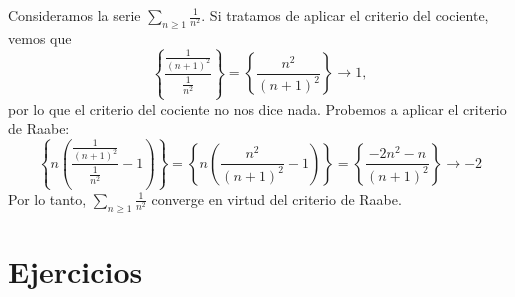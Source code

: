 \begin{ejemplo}
    Consideramos la serie $\displaystyle\sum_{n \geq 1} \frac{1}{n^2}$.
    Si tratamos de aplicar el criterio del cociente, vemos que
    \begin{equation*}
        \left\{ \frac{\frac{1}{(n+1)^2}}{\frac{1}{n^2}} \right\} = \left\{ \frac{n^2}{(n+1)^2} \right\} \longrightarrow 1,
    \end{equation*}
    por lo que el criterio del cociente no nos dice nada. Probemos a aplicar el criterio de Raabe:
    \begin{equation*}
        \left\{ n \left(\frac{\frac{1}{(n+1)^2}}{\frac{1}{n^2}} -1\right) \right\} = \left\{ n\left(\frac{n^2}{(n+1)^2}-1\right) \right\} = \left\{ \frac{-2n^2-n}{(n+1)^2} \right\} \longrightarrow -2
    \end{equation*}
    Por lo tanto, $\displaystyle\sum_{n \geq 1} \frac{1}{n^2}$ converge en virtud del criterio de Raabe.
\end{ejemplo}


\section{Ejercicios}

\renewcommand{\theenumi}{\alph{enumi}} %

